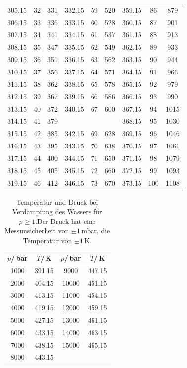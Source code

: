 \begin{table}
\begin{tabular}{
  c c c||c c c||c c c
}
305.15 & 32 & 331 & 332.15 & 59 & 520 & 359.15 & 86 & 879 \\
306.15 & 33 & 336 & 333.15 & 60 & 528 & 360.15 & 87 & 901 \\
307.15 & 34 & 341 & 334.15 & 61 & 537 & 361.15 & 88 & 913 \\
308.15 & 35 & 347 & 335.15 & 62 & 549 & 362.15 & 89 & 933 \\ 
309.15 & 36 & 351 & 336.15 & 63 & 562 & 363.15 & 90 & 944 \\
310.15 & 37 & 356 & 337.15 & 64 & 571 & 364.15 & 91 & 966 \\
311.15 & 38 & 362 & 338.15 & 65 & 578 & 365.15 & 92 & 979 \\
312.15 & 39 & 367 & 339.15 & 66 & 586 & 366.15 & 93 & 990 \\
313.15 & 40 & 372 & 340.15 & 67 & 600 & 367.15 & 94 & 1015\\
314.15 & 41 & 379 & \text{--} &  &    & 368.15 & 95 & 1030\\
315.15 & 42 & 385 & 342.15 & 69 & 628 & 369.15 & 96 & 1046\\
316.15 & 43 & 395 & 343.15 & 70 & 638 & 370.15 & 97 & 1061\\
317.15 & 44 & 400 & 344.15 & 71 & 650 & 371.15 & 98 & 1079\\
318.15 & 45 & 405 & 345.15 & 72 & 660 & 372.15 & 99 & 1093\\
319.15 & 46 & 412 & 346.15 & 73 & 670 & 373.15 & 100 & 1108 \\
\bottomrule
\end{tabular}
\end{table}
\begin{table}[H]
  \centering
  \caption{Temperatur und Druck bei Verdampfung des Wassers für $p\geq 1$.Der Druck hat eine Messunsicherheit von
  $\pm1$\,mbar, die Temperatur von $\pm 1$\,K.}
  \label{tab:Messreihe_2}
\begin{tabular}{
  c c||c c
}
\toprule 
$p$/\,bar & $T$/\,K & $p$/\,bar & $T$/\,K\\
\midrule
1000  & 391.15 & 9000  & 447.15\\
2000  & 404.15 & 10000 & 451.15\\
3000  & 413.15 & 11000 & 454.15\\
4000  & 419.15 & 12000 & 459.15\\
5000  & 427.15 & 13000 & 461.15\\
6000  & 433.15 & 14000 & 463.15\\
7000  & 438.15 & 15000 & 465.15\\
8000  & 443.15 &       &      \\
\bottomrule
\end{tabular}
\end{table}
